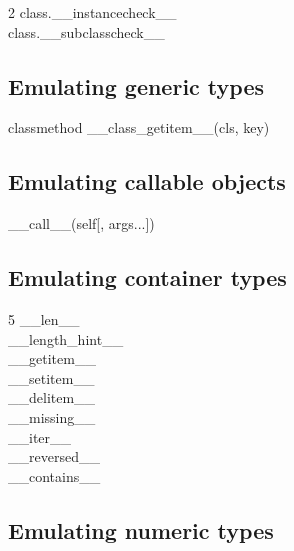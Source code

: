 \documentclass [8pt] {extarticle}
\begin{document}
\begin {multicols} {2}
    class.\_\_instancecheck\_\_ \\
    class.\_\_subclasscheck\_\_ \\

    \subsection {Emulating generic types}

    classmethod \_\_class\_getitem\_\_(cls, key)

    \subsection {Emulating callable objects}

    \_\_call\_\_(self[, args...])

    \end {multicols}

    \subsection {Emulating container types}

    \begin {multicols} {5}
    \_\_len\_\_ \\
    \_\_length\_hint\_\_ \\
    \_\_getitem\_\_ \\
    \_\_setitem\_\_ \\
    \_\_delitem\_\_ \\
    \_\_missing\_\_ \\
    \_\_iter\_\_ \\
    \_\_reversed\_\_ \\
    \_\_contains\_\_ \\
    \end {multicols}

    \subsection {Emulating numeric types}
\end{document}
